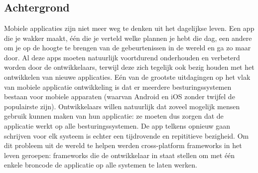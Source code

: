 
\chapter{}
\label{ch:inleiding}

%

\section{Achtergrond}
\label{sec:achtergrond}

Mobiele applicaties zijn niet meer weg te denken uit het dagelijkse leven. Een
app die je wakker maakt, één die je verteld welke plannen je hebt die dag, een
andere om je op de hoogte te brengen van de gebeurtenissen in de wereld en ga zo
maar door. Al deze apps moeten natuurlijk voortdurend onderhouden en verbeterd
worden door de ontwikkelaars, terwijl deze zich tegelijk ook bezig houden met
het ontwikkelen van nieuwe applicaties. Eén van de grootste uitdagingen op het
vlak van mobiele applicatie ontwikkeling is dat er meerdere besturingssystemen
bestaan voor mobiele apparaten (waarvan Android en iOS zonder twijfel de
populairste zijn). Ontwikkelaars willen natuurlijk dat zoveel mogelijk mensen
gebruik kunnen maken van hun applicatie: ze moeten dus zorgen dat de applicatie
werkt op alle besturingssystemen. De app telkens opnieuw gaan schrijven voor elk
systeem is echter een tijdrovende en repititieve bezigheid. Om dit probleem uit
de wereld te helpen werden cross-platform frameworks in het leven geroepen:
frameworks die de ontwikkelaar in staat stellen om met één enkele broncode de
applicatie op alle systemen te laten werken.

